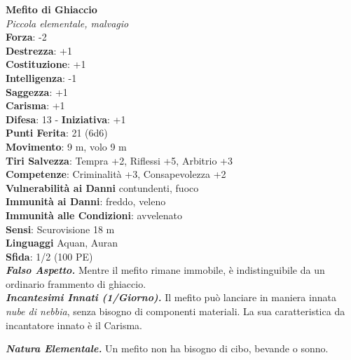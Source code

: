 \begin{multicols}{2}
\medskip\textbf{Mefito di Ghiaccio}\\
\emph{Piccola elementale, malvagio}\\
\textbf{Forza}: -2\\
\textbf{Destrezza}: +1\\
\textbf{Costituzione}: +1\\
\textbf{Intelligenza}: -1\\
\textbf{Saggezza}: +1\\
\textbf{Carisma}: +1\\
\textbf{Difesa}: 13 - \textbf{Iniziativa}: +1\\
\textbf{Punti Ferita}: 21 (6d6)\\
\textbf{Movimento}: 9 m, volo 9 m \\
\textbf{Tiri Salvezza}: Tempra +2, Riflessi +5, Arbitrio +3\\
\textbf{Competenze}: Criminalità +3, Consapevolezza +2\\
\textbf{Vulnerabilità ai Danni} contundenti, fuoco\\
\textbf{Immunità ai Danni}: freddo, veleno\\
\textbf{Immunità alle Condizioni}: avvelenato\\
\textbf{Sensi}: Scurovisione 18 m\\
\textbf{Linguaggi} Aquan, Auran\\
\textbf{Sfida}: 1/2 (100 PE)\smallskip\\
\emph{\textbf{Falso Aspetto.}} Mentre il mefito rimane immobile, è indistinguibile da un ordinario frammento di ghiaccio.\\
\emph{\textbf{Incantesimi Innati (1/Giorno).}} Il mefito può lanciare in maniera innata \emph{nube di nebbia}, senza bisogno di componenti materiali. La sua caratteristica da incantatore innato è il Carisma.

\emph{\textbf{Natura Elementale.}} Un mefito non ha bisogno di cibo, bevande o sonno.\\


\end{multicols}
